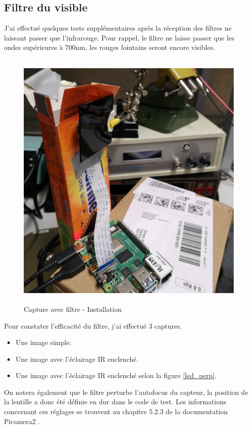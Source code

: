 \subsection{Filtre du visible}
J'ai effectué quelques tests supplémentaires après la réception des filtres ne laissant passer que l'infrarouge. Pour rappel, le filtre
ne laisse passer que les ondes supérieures à 700nm, les rouges lointains seront encore visibles.

\begin{figure}[H]
    \centering
    \includegraphics[height=13cm]{assets/figures/filtre.jpg}
    \caption{Capture avec filtre - Installation}
\end{figure}

Pour constater l'efficacité du filtre, j'ai effectué 3 captures.
\begin{itemize}
    \item Une image simple.
    \item Une image avec l'éclairage IR enclenché.
    \item Une image avec l'éclairage IR enclenché selon la figure \ref{led_perp}.
\end{itemize}
On notera également que le filtre perturbe l'autofocus du capteur, la position de la lentille a donc été définie en dur dans le code de test.
Les informations concernant ces réglages se trouvent au chapitre 5.2.3 de la documentation Picamera2 \cite{picamera2}.

